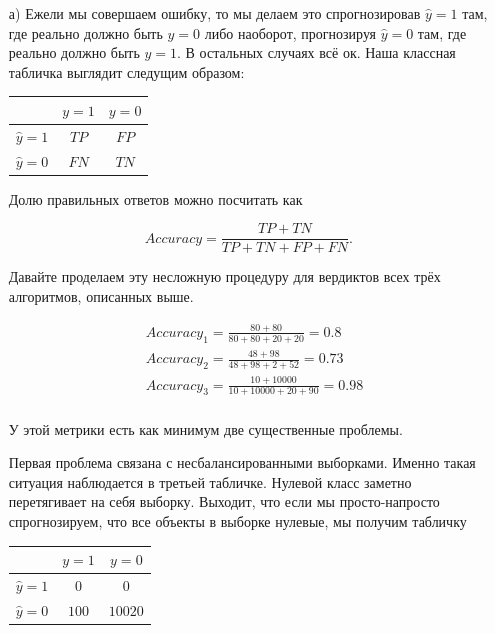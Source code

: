 \documentclass[12pt, a4paper, oneside]{article}
\begin{document}
	\begin{enumerate}
		\item[а)] 	Ежели мы совершаем ошибку, то мы делаем это спрогнозировав $\hat y = 1$ там, где реально должно быть $y = 0$ либо наоборот, прогнозируя $\hat y = 0$ там, где реально должно быть $y=1$.  В остальных случаях всё ок.  Наша классная табличка выглядит следущим образом: 
		
		\begin{center}
			\begin{tabular}{|c|c|c|}
				\hline
				& $y=1$  &  $ y = 0$ \\  \hline 
				$\hat y = 1$  &    $TP$ &     $FP$ \\      \hline 
				$\hat y = 0$ &    $FN$ &     $TN$ \\      \hline 
			\end{tabular}
		\end{center}
		
		Долю правильных ответов можно посчитать как 
		
		\[
		Accuracy = \frac{TP + TN}{TP + TN + FP + FN}.
		\]
		
		Давайте проделаем эту несложную процедуру для вердиктов всех трёх алгоритмов, описанных выше. 
		
		\begin{equation} 
		\begin{aligned}
		&Accuracy_1 = \frac{80 + 80}{80 + 80 + 20 + 20} = 0.8   \\ 
		&Accuracy_2 = \frac{48 + 98}{48 + 98 + 2 + 52} = 0.73  \\ 
		&Accuracy_3 = \frac{10 + 10000}{10 + 10000 + 20 + 90} = 0.98  \\ 
		\end{aligned}
		\end{equation} 
		
		У этой метрики есть как минимум две существенные проблемы. 
		
		Первая проблема связана с несбалансированными выборками. Именно такая ситуация наблюдается в третьей табличке. Нулевой класс заметно перетягивает на себя выборку. Выходит, что если мы просто-напросто спрогнозируем, что все объекты в выборке нулевые, мы получим табличку 
		
		\begin{center}
			\begin{tabular}{|c|c|c|}
				\hline
				& $y=1$  &  $ y = 0$ \\  \hline 
				$\hat y = 1$  &   $0$ &    $0$ \\         \hline 
				$\hat y = 0$ &   $100$ &    $10020$ \\   \hline 
			\end{tabular}
		\end{center}
		

\end{enumerate}
\end{document}
